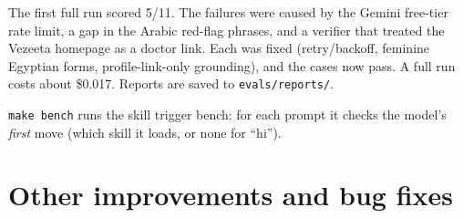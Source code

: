 \documentclass[11pt,a4paper]{article}
\newcommand{\code}[1]{\texttt{#1}}
\begin{document}
The first full run scored 5/11. The failures were caused by the Gemini free-tier rate limit, a gap in the Arabic red-flag phrases, and a verifier that treated the Vezeeta homepage as a doctor link. Each was fixed (retry/backoff, feminine Egyptian forms, profile-link-only grounding), and the cases now pass. A full run costs about \$0.017. Reports are saved to \code{evals/reports/}.

\code{make bench} runs the skill trigger bench: for each prompt it checks the model's \emph{first} move (which skill it loads, or none for ``hi'').

\section{Other improvements and bug fixes}\label{sec:fixes}
\end{document}
